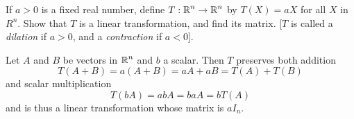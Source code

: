 \documentclass[../main.tex]{subfiles}
\begin{document}
If $a > 0$ is a fixed real number, define $T: \operatorname{\mathbb{R}}^n \to \operatorname{\mathbb{R}}^n$ by $T(X) = aX$ for all $X$ in $R^n$. Show that $T$ is a linear transformation, and find its matrix. [$T$ is called a \emph{dilation} if $a > 0$, and a \emph{contraction} if $a < 0$].

\solution
Let $A$ and $B$ be vectors in $\operatorname{\mathbb{R}}^n$ and $b$ a scalar. Then $T$ preserves both addition
\[
	T(A + B) = a(A + B) = aA + aB = T(A) + T(B)
\]
and scalar multiplication
\[
	T(bA) = abA = baA = bT(A)
\]
and is thus a linear transformation whose matrix is $aI_n$.
\end{document}
